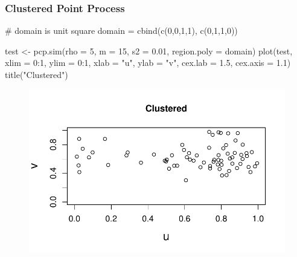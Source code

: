 \documentclass[
  letterpaper,
  DIV=11,
  numbers=noendperiod]{scrartcl}
\newenvironment{Shaded}{\begin{snugshade}}{\end{snugshade}}
\newcommand{\AttributeTok}[1]{\textcolor[rgb]{0.40,0.45,0.13}{#1}}
\newcommand{\CommentTok}[1]{\textcolor[rgb]{0.37,0.37,0.37}{#1}}
\newcommand{\DecValTok}[1]{\textcolor[rgb]{0.68,0.00,0.00}{#1}}
\newcommand{\FloatTok}[1]{\textcolor[rgb]{0.68,0.00,0.00}{#1}}
\newcommand{\FunctionTok}[1]{\textcolor[rgb]{0.28,0.35,0.67}{#1}}
\newcommand{\NormalTok}[1]{\textcolor[rgb]{0.00,0.23,0.31}{#1}}
\newcommand{\OtherTok}[1]{\textcolor[rgb]{0.00,0.23,0.31}{#1}}
\newcommand{\SpecialCharTok}[1]{\textcolor[rgb]{0.37,0.37,0.37}{#1}}
\newcommand{\StringTok}[1]{\textcolor[rgb]{0.13,0.47,0.30}{#1}}
\begin{document}
\hypertarget{clustered-point-process}{%
\subsubsection{Clustered Point Process}\label{clustered-point-process}}

\begin{Shaded}
\begin{Highlighting}[]
\CommentTok{\# domain is unit square}
\NormalTok{domain }\OtherTok{=} \FunctionTok{cbind}\NormalTok{(}\FunctionTok{c}\NormalTok{(}\DecValTok{0}\NormalTok{,}\DecValTok{0}\NormalTok{,}\DecValTok{1}\NormalTok{,}\DecValTok{1}\NormalTok{), }\FunctionTok{c}\NormalTok{(}\DecValTok{0}\NormalTok{,}\DecValTok{1}\NormalTok{,}\DecValTok{1}\NormalTok{,}\DecValTok{0}\NormalTok{))}


\NormalTok{test }\OtherTok{\textless{}{-}} \FunctionTok{pcp.sim}\NormalTok{(}\AttributeTok{rho =} \DecValTok{5}\NormalTok{, }\AttributeTok{m =} \DecValTok{15}\NormalTok{, }\AttributeTok{s2 =} \FloatTok{0.01}\NormalTok{, }\AttributeTok{region.poly =}\NormalTok{ domain)}
\FunctionTok{plot}\NormalTok{(test, }\AttributeTok{xlim =} \DecValTok{0}\SpecialCharTok{:}\DecValTok{1}\NormalTok{, }\AttributeTok{ylim =} \DecValTok{0}\SpecialCharTok{:}\DecValTok{1}\NormalTok{, }\AttributeTok{xlab =} \StringTok{"u"}\NormalTok{, }\AttributeTok{ylab =} \StringTok{"v"}\NormalTok{, }
     \AttributeTok{cex.lab =} \FloatTok{1.5}\NormalTok{, }\AttributeTok{cex.axis =} \FloatTok{1.1}\NormalTok{)}
\FunctionTok{title}\NormalTok{(}\StringTok{"Clustered"}\NormalTok{)}
\end{Highlighting}
\end{Shaded}

\begin{figure}[H]

{\centering \includegraphics{robby_homework_1---Copy_files/figure-pdf/unnamed-chunk-4-1.pdf}

}

\end{figure}
\end{document}
